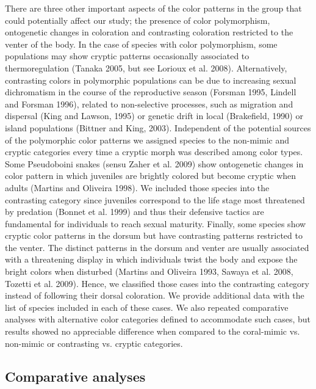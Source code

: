 There are three other important aspects of the color patterns in the group that could potentially affect our study; the presence of color polymorphism, ontogenetic changes in coloration and contrasting coloration restricted to the venter of the body. In the case of species with color polymorphism, some populations may show cryptic patterns occasionally associated to thermoregulation (Tanaka 2005, but see Lorioux et al. 2008). Alternatively, contrasting colors in polymorphic populations can be due to increasing sexual dichromatism in the course of the reproductive season (Forsman 1995, Lindell and Forsman 1996), related to non-selective processes, such as migration and dispersal (King and Lawson, 1995) or genetic drift in local (Brakefield, 1990) or island populations (Bittner and King, 2003). Independent of the potential sources of the polymorphic color patterns we assigned species to the non-mimic and cryptic categories every time a cryptic morph was described among color types. Some Pseudoboini snakes (sensu Zaher et al. 2009) show ontogenetic changes in color pattern in which juveniles are brightly colored but become cryptic when adults (Martins and Oliveira 1998). We included those species into the contrasting category since juveniles correspond to the life stage most threatened by predation (Bonnet et al. 1999) and thus their defensive tactics are fundamental for individuals to reach sexual maturity. Finally, some species show cryptic color patterns in the dorsum but have contrasting patterns restricted to the venter. The distinct patterns in the dorsum and venter are usually associated with a threatening display in which individuals twist the body and expose the bright colors when disturbed (Martins and Oliveira 1993, Sawaya et al. 2008, Tozetti et al. 2009). Hence, we classified those cases into the contrasting category instead of following their dorsal coloration. We provide additional data with the list of species included in each of these cases. We also repeated comparative analyses with alternative color categories defined to accommodate such cases, but results showed no appreciable difference when compared to the coral-mimic vs. non-mimic or contrasting vs. cryptic categories.

\subsection{Comparative analyses}

